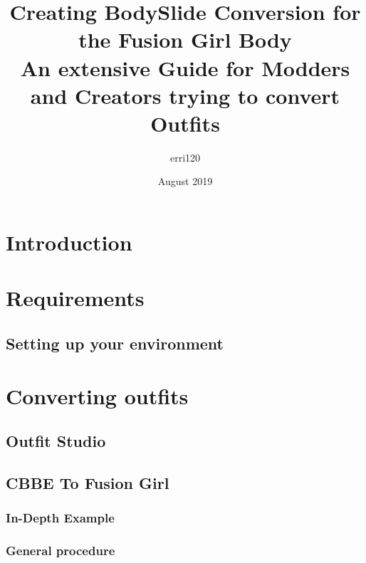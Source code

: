 \documentclass[12pt]{article}
\begin{document}
\title{Creating BodySlide Conversion for the Fusion Girl Body\\[0.2em]\smaller{}
An extensive Guide for Modders and Creators trying to convert Outfits}
\author{erri120}
\date{August 2019}
\maketitle
\clearpage
\tableofcontents
\clearpage
\section{Introduction}

\section{Requirements}

\pagebreak
\subsection{Setting up your environment}

\pagebreak
\section{Converting outfits}
\subsection{Outfit Studio}

\pagebreak
\subsection{CBBE To Fusion Girl}
\subsubsection{In-Depth Example}

\pagebreak
\subsubsection{General procedure}

\pagebreak
\end{document}

